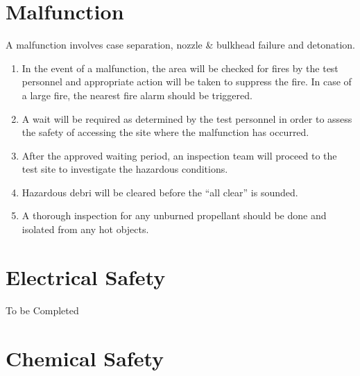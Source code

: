 \documentclass[12pt,letterpaper]{article}
\begin{document}
    \section{Malfunction}
        \noindent A malfunction involves case separation, nozzle \&
        bulkhead failure and detonation.
            \begin{enumerate}
                \begin{enumerate}
                    \item In the event of a malfunction, the area will be
                    checked for fires by the test personnel and appropriate
                    action will be taken to suppress the fire. In case of a
                    large fire, the nearest fire alarm should be triggered.
                    \item A wait will be required as determined by the test
                    personnel in order to assess the safety of accessing the
                    site where the malfunction has occurred.
                    \item After the approved waiting period, an inspection
                    team will proceed to the test site to investigate the
                    hazardous conditions.
                    \item Hazardous debri will be cleared before the
                    “all clear” is sounded.
                    \item A thorough inspection for any unburned propellant
                    should be done and isolated from any hot objects.
                \end{enumerate}
            \end{enumerate}
    \section{Electrical Safety}
        \noindent To be Completed
    \section{Chemical Safety}
\end{document}
